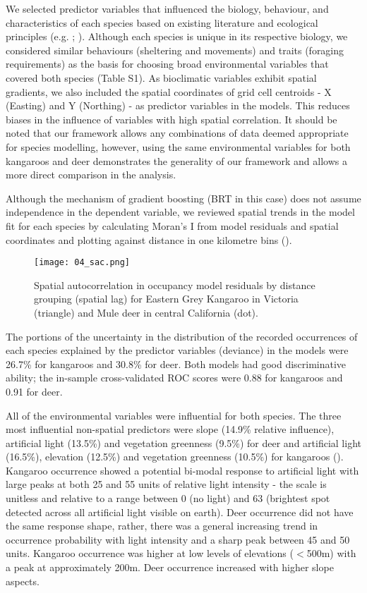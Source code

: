 We selected predictor variables that influenced the biology, behaviour, and characteristics of each species based on existing literature and ecological principles (e.g. \cite{coul10}; \cite{ferg05}). Although each species is unique in its respective biology, we considered similar behaviours (sheltering and movements) and traits (foraging requirements) as the basis for choosing broad environmental variables that covered both species (Table S1).  As bioclimatic variables exhibit spatial gradients, we also included the spatial coordinates of grid cell centroids - X (Easting) and Y (Northing) - as predictor variables in the models.  This reduces biases in the influence of variables with high spatial correlation.  It should be noted that our framework allows any combinations of data deemed appropriate for species modelling, however, using the same environmental variables for both kangaroos and deer demonstrates the generality of our framework and allows a more direct comparison in the analysis.

Although the mechanism of gradient boosting (BRT in this case) does not assume independence in the dependent variable, we reviewed spatial trends in the model fit for each species by calculating Moran’s I from model residuals and spatial coordinates and plotting against distance in one kilometre bins ().

\begin{figure*}[htp]
  \centering
  \texttt{[image: 04\_sac.png]}
  \caption[Spatial autocorrelation in occupancy model residuals for kangaroos and deer]{Spatial autocorrelation in occupancy model residuals by distance grouping (spatial lag) for Eastern Grey Kangaroo in Victoria (triangle) and Mule deer in central California (dot).}
  \label{cal_sac_occ}
\end{figure*}

The portions of the uncertainty in the distribution of the recorded occurrences of each species explained by the predictor variables (deviance) in the models were 26.7\% for kangaroos and 30.8\% for deer. Both models had good discriminative ability; the in-sample cross-validated ROC scores were 0.88 for kangaroos and 0.91 for deer.

All of the environmental variables were influential for both species. The three most influential non-spatial predictors were slope (14.9\% relative influence), artificial light (13.5\%) and vegetation greenness (9.5\%) for deer and artificial light (16.5\%), elevation (12.5\%) and vegetation greenness (10.5\%) for kangaroos ().  Kangaroo occurrence showed a potential bi-modal response to artificial light with large peaks at both 25 and 55 units of relative light intensity - the scale is unitless and relative to a range between 0 (no light) and 63 (brightest spot detected across all artificial light visible on earth).  Deer occurrence did not have the same response shape, rather, there was a general increasing trend in occurrence probability with light intensity and a sharp peak between 45 and 50 units. Kangaroo occurrence was higher at low levels of elevations ($<$500m) with a peak at approximately 200m.  Deer occurrence increased with higher slope aspects.

